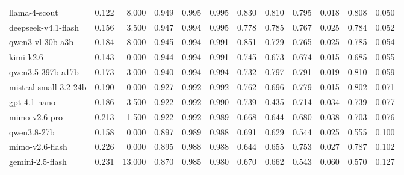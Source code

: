 \begin{table}
\begin{tabular}{lrrrrrrrrrrr}
llama-4-scout & 0.122 & 8.000 & 0.949 & 0.995 & 0.995 & 0.830 & 0.810 & 0.795 & 0.018 & 0.808 & 0.050 \\
deepseek-v4.1-flash & 0.156 & 3.500 & 0.947 & 0.994 & 0.995 & 0.778 & 0.785 & 0.767 & 0.025 & 0.784 & 0.052 \\
qwen3-vl-30b-a3b & 0.184 & 8.000 & 0.945 & 0.994 & 0.991 & 0.851 & 0.729 & 0.765 & 0.025 & 0.785 & 0.054 \\
kimi-k2.6 & 0.143 & 0.000 & 0.944 & 0.994 & 0.991 & 0.745 & 0.673 & 0.674 & 0.015 & 0.685 & 0.055 \\
qwen3.5-397b-a17b & 0.173 & 3.000 & 0.940 & 0.994 & 0.994 & 0.732 & 0.797 & 0.791 & 0.019 & 0.810 & 0.059 \\
mistral-small-3.2-24b & 0.190 & 0.000 & 0.927 & 0.992 & 0.992 & 0.762 & 0.696 & 0.779 & 0.015 & 0.802 & 0.071 \\
gpt-4.1-nano & 0.186 & 3.500 & 0.922 & 0.992 & 0.990 & 0.739 & 0.435 & 0.714 & 0.034 & 0.739 & 0.077 \\
mimo-v2.6-pro & 0.213 & 1.500 & 0.922 & 0.992 & 0.989 & 0.668 & 0.644 & 0.680 & 0.038 & 0.703 & 0.076 \\
qwen3.8-27b & 0.158 & 0.000 & 0.897 & 0.989 & 0.988 & 0.691 & 0.629 & 0.544 & 0.025 & 0.555 & 0.100 \\
mimo-v2.6-flash & 0.226 & 0.000 & 0.895 & 0.988 & 0.988 & 0.644 & 0.655 & 0.753 & 0.027 & 0.787 & 0.102 \\
gemini-2.5-flash & 0.231 & 13.000 & 0.870 & 0.985 & 0.980 & 0.670 & 0.662 & 0.543 & 0.060 & 0.570 & 0.127 \\
\bottomrule
\end{tabular}
\end{table}
